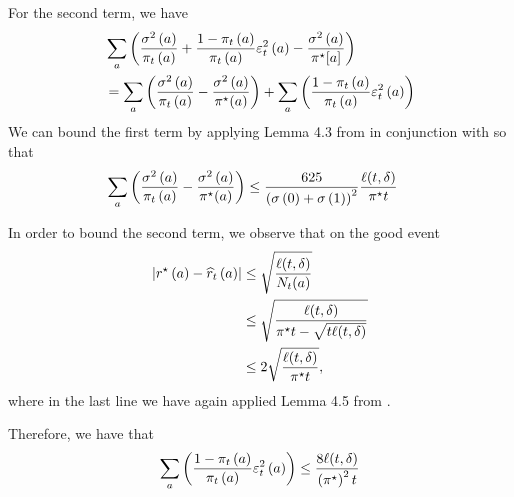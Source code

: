         For the second term, we have
        \begin{align}
            &\sum_{\aidx} \paren{
                        \frac{\var[\aidx]}{\policy[\round][\aidx]} 
                        + \frac{1 - \policy[\round][\aidx]}{\policy[\round][\aidx]}\predRewardError[\round][\aidx][2] 
                        - \frac{\var[\aidx]}{\neymanPolicy[\aidx]}
                    } \\
            &= \sum_{\aidx} \paren{
                        \frac{\var[\aidx]}{\policy[\round][\aidx]} 
                        - \frac{\var[\aidx]}{\neymanPolicy(\aidx)}
                    }
                + \sum_{\aidx} \paren{
                        \frac{1 - \policy[\round][\aidx]}{\policy[\round][\aidx]}\predRewardError[\round][\aidx][2] 
                    } \\
        \end{align}
        We can bound the first term by applying Lemma 4.3 from \cite{neopane2024logarithmic} in conjunction with so that
        \begin{align}
            \sum_{\aidx} \paren{
                        \frac{\var[\aidx]}{\policy[\round][\aidx]} 
                        - \frac{\var[\aidx]}{\neymanPolicy(\aidx)}
                    }
            &\leq \frac{625}{\paren{\stdev[0] + \stdev[1]}^2}\frac{\ell(\round, \errorProb)}{\neymanPolicy \round}
        \end{align}

        In order to bound the second term, we observe that on the good event
        \begin{align}
            \abs{\trueReward[\aidx] - \predReward[\round][\aidx]} 
                &\leq \sqrt{\frac{\ell(\round, \errorProb)}{\acount{\round}{\aidx}}} \\
                &\leq \sqrt{\frac{\ell(\round, \errorProb)}{\neymanPolicy\round - \sqrt{\round \ell(\round, \errorProb)}}} \\
                &\leq 2  \sqrt{\frac{\ell(\round, \errorProb)}{\neymanPolicy\round}},
        \end{align}
        where in the last line we have again applied Lemma 4.5 from \cite{neopane2024logarithmic}.

        Therefore, we have that
        \begin{equation}
            \sum_{\aidx} \paren{
                        \frac{1 - \policy[\round][\aidx]}{\policy[\round][\aidx]}\predRewardError[\round][\aidx][2] 
                    }
            \leq \frac{8\ell(\round, \errorProb)}{\paren{\neymanPolicy}^2\round}
        \end{equation}

